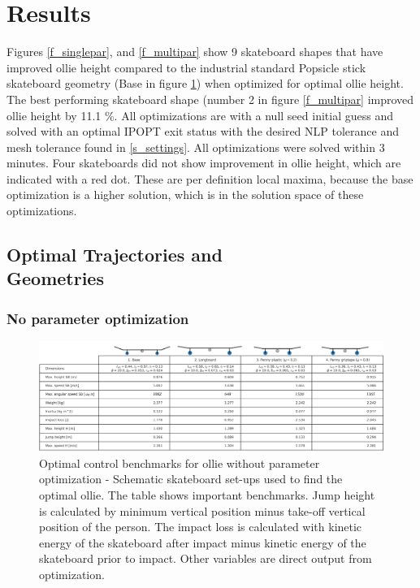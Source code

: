 
\section{Results}
\noindent Figures \ref{f_singlepar}, and \ref{f_multipar} show 9 skateboard shapes that have improved ollie height compared to the industrial standard Popsicle stick skateboard geometry (Base in figure \ref{f_nopar}) when optimized for optimal ollie height. The best performing skateboard shape (number 2 in figure \ref{f_multipar} improved ollie height by 11.1 \%. All optimizations are with a null seed initial guess and solved with an optimal IPOPT exit status with the desired NLP tolerance and mesh tolerance found in \ref{s_settings}. All optimizations were solved within 3 minutes. Four skateboards did not show improvement in ollie height, which are indicated with a red dot. These are per definition local maxima, because the base optimization is a higher solution, which is in the solution space of these optimizations. 

\subsection{Optimal Trajectories and \\Geometries}
\subsubsection{No parameter optimization}
\begin{figure}
    \centering
    \includegraphics[trim={0 0 0 0},clip,width=\textwidth]{figure/Results/no_optimization_table_dpi600.png}
    \caption[Optimal control  benchmarks for ollie without parameter optimization]{Optimal control benchmarks for ollie without parameter optimization - Schematic skateboard set-ups used to find the optimal ollie. The table shows important benchmarks. Jump height is calculated by minimum vertical position minus take-off vertical position of the person. The impact loss is calculated with kinetic energy of the skateboard after impact minus kinetic energy of the skateboard prior to impact. Other variables are direct output from optimization. }
    \label{f_nopar}
\end{figure}

